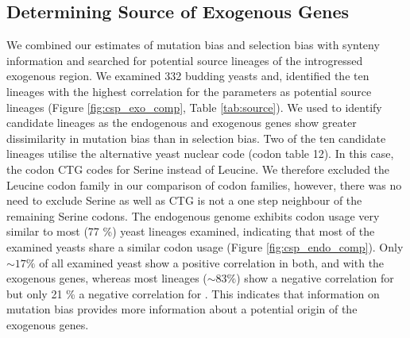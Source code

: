 \documentclass[fleqn,letterpaper]{article}
\begin{document}
\subsection*{Determining Source of Exogenous Genes}

We combined our estimates of mutation bias \DM and selection bias \DE with synteny information and searched for potential source lineages of the introgressed exogenous region.
We examined 332 budding yeasts \citep{shen2018} and, identified the ten lineages with the highest correlation for the \DM parameters as potential source lineages (Figure \ref{fig:csp_exo_comp}, Table \ref{tab:source}).
We used \DM to identify candidate lineages as the endogenous and exogenous genes show greater dissimilarity in mutation bias than in selection bias.
Two of the ten candidate lineages utilise the alternative yeast nuclear code (codon table 12). 
In this case, the codon CTG codes for Serine instead of Leucine. 
We therefore excluded the Leucine codon family in our comparison of codon families, however, there was no need to exclude Serine as well as CTG is not a one step neighbour of the remaining Serine codons.
The endogenous \kluyveri genome exhibits codon usage very similar to most (77 \%) yeast lineages examined, indicating that most of the examined yeasts share a similar codon usage (Figure \ref{fig:csp_endo_comp}).
Only $\sim 17 \%$ of all examined yeast show a positive correlation in both, \DM and \DE with the exogenous genes, whereas most lineages ($\sim 83 \%$) show a negative correlation for \DM but only 21 \% a negative correlation for \DE.
This indicates that information on mutation bias provides more information about a potential origin of the exogenous genes.
\end{document}
